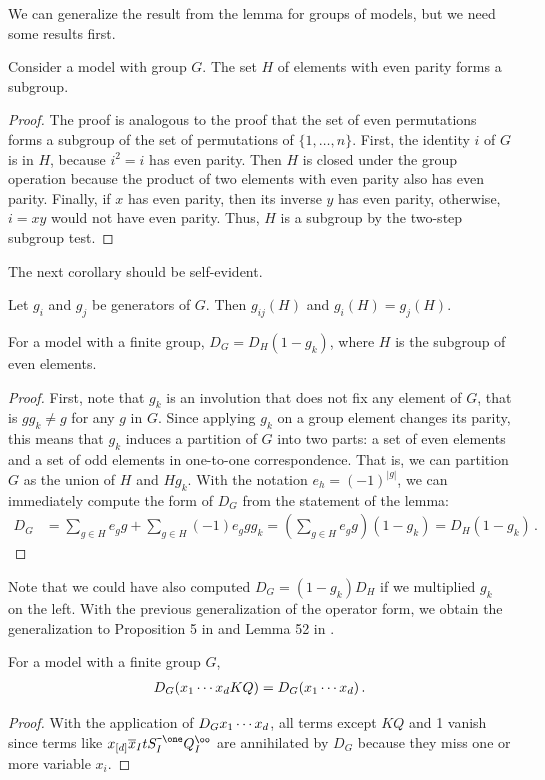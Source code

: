 We can generalize the result from the lemma for groups of \highD models, but we need some results first.
\begin{lem} Consider a \classic \dD model with group $G$. The set $H$ of elements with even parity forms a subgroup.
\end{lem}
\begin{proof} The proof is analogous to the proof that the set of even permutations forms a subgroup of the set of permutations of $\{1,\ldots, n\}$. First, the identity $i$ of $G$ is in $H$, because $i^2 = i$ has even parity. Then $H$ is closed under the group operation because the product of two elements with even parity also has even parity. Finally, if $x$ has even parity, then its inverse $y$ has even parity, otherwise, $i = x y$ would not have even parity. Thus, $H$ is a subgroup by the two-step subgroup test.
\end{proof}
The next corollary should be self-evident.
\begin{prop}\label{cor:Hfix} Let $g_i$ and $g_j$ be generators of $G$. Then $g_{ij}(H)$ and $g_i(H) = g_j(H)$.
\end{prop}
\begin{lem}For a \classic \dD model with a finite group, $D_G = D_H(1-g_k)$, where $H$ is the subgroup of even elements.
\end{lem}
\begin{proof} First, note that $g_k$ is an involution that does not fix any element of $G$, that is $gg_k \neq g$ for any $g$ in $G$. Since applying $g_k$ on a group element changes its parity, this means that $g_k$ induces a partition of $G$ into two parts: a set of even elements and a set of odd elements in one-to-one correspondence. That is, we can partition $G$ as the union of $H$ and $Hg_k$. With the notation $e_h = (-1)^{|g|}$, we can immediately compute the form of $D_G$ from the statement of the lemma:
\begin{align}
	D_G &=\sum_{g \in H} e_g g + \sum_{g \in H} (-1)e_g g g_k= \left(\sum_{g \in H} e_g g\right)(1-g_k) = D_H(1-g_k)\,.
\end{align}
\end{proof}
Note that we could have also computed $D_G = (1-g_k)D_H$ if we multiplied $g_k$ on the left.
With the previous generalization of the operator form, we obtain the \dD generalization to Proposition 5 in \cite[p.~11]{bousquet2010walks} and Lemma 52 in \cite[p.~59]{melczer2014variants}.
\begin{thm} For a \classic \dD model with a finite group $G$,
\begin{align}
	D_G(x_1\cdots x_d KQ) = D_G(x_1\cdots x_d)\,.
\end{align}
\end{thm}
\begin{proof} With the application of $D_G x_1\cdots x_d$, all terms except $KQ$ and 1 vanish since terms like $x_{[d]} \ol x_I t S_I^{\um \one} Q_I^\oo$ are annihilated by $D_G$ because they miss one or more variable $x_i$.
\end{proof}

